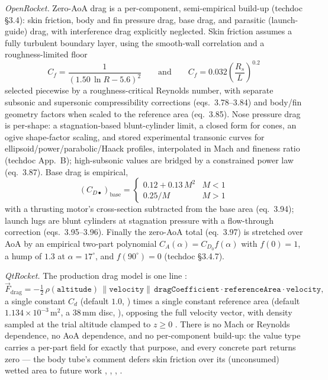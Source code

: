 \emph{OpenRocket.} Zero-AoA drag is a per-component, semi-empirical build-up (techdoc
\S 3.4): skin friction, body and fin pressure drag, base drag, and parasitic (launch-guide)
drag, with interference drag explicitly neglected. Skin friction assumes a fully turbulent
boundary layer, using the smooth-wall correlation and a roughness-limited floor
\begin{equation}
C_f = \frac{1}{(1.50\,\ln R - 5.6)^2}
\qquad\text{and}\qquad
C_f = 0.032\left(\frac{R_s}{L}\right)^{0.2}
\end{equation}
selected piecewise by a roughness-critical Reynolds number, with separate subsonic and
supersonic compressibility corrections (eqs.~3.78--3.84) and body/fin geometry factors when
scaled to the reference area (eq.~3.85). Nose pressure drag is per-shape: a stagnation-based
blunt-cylinder limit, a closed form for cones, an ogive shape-factor scaling, and stored
experimental transonic curves for ellipsoid/power/parabolic/Haack profiles, interpolated in
Mach and fineness ratio (techdoc App.~B); high-subsonic values are bridged by a constrained
power law (eq.~3.87). Base drag is empirical,
\begin{equation}
(C_{D\bullet})_{\mathrm{base}} =
\begin{cases}
0.12 + 0.13\,M^2 & M < 1\\[2pt]
0.25/M & M > 1
\end{cases}
\end{equation}
with a thrusting motor's cross-section subtracted from the base area (eq.~3.94); launch lugs
are blunt cylinders at stagnation pressure with a flow-through correction (eqs.~3.95--3.96).
Finally the zero-AoA total (eq.~3.97) is stretched over AoA by an empirical two-part
polynomial $C_A(\alpha) = C_{D_0} f(\alpha)$ with $f(0)=1$, a hump of $1.3$ at
$\alpha = 17^\circ$, and $f(90^\circ) = 0$ (techdoc \S 3.4.7).

\emph{QtRocket.} The production drag model is one line
:
\begin{equation}
\vec F_{\mathrm{drag}} = -\tfrac{1}{2}\,\rho(\mathtt{altitude})\,
\lVert \mathtt{velocity} \rVert \,
\mathtt{dragCoefficient}\cdot\mathtt{referenceArea}\cdot\mathtt{velocity},
\end{equation}
a single constant $C_d$ (default $1.0$, ) times a single
constant reference area (default $1.134\times 10^{-3}\,\mathrm{m}^2$, a 38\,mm disc,
), opposing the full velocity vector, with density sampled
at the trial altitude clamped to $z \ge 0$ . There is no
Mach or Reynolds dependence, no AoA dependence, and no per-component build-up: the
 value type carries a per-part  field for exactly that purpose,
and every concrete part returns zero --- the body tube's comment defers skin friction over
its (unconsumed) wetted area to future work ,
, ,
.

